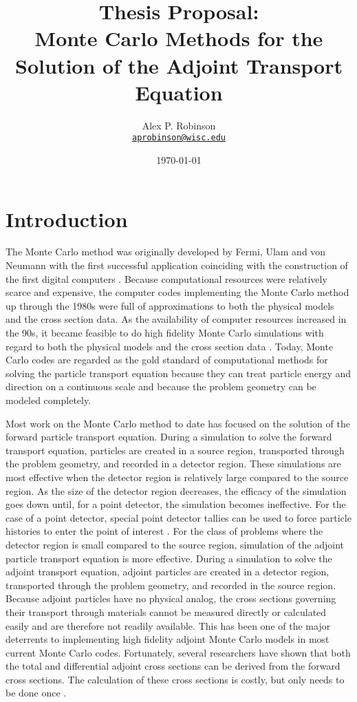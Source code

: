 \documentclass[letterpaper,12pt]{article}
\author{Alex P. Robinson
\\ \href{mailto:aprobinson@wisc.edu}{\texttt{aprobinson@wisc.edu}}
}
\date{\today}
\title{Thesis Proposal:\\
  Monte Carlo Methods for the Solution of the Adjoint Transport Equation}
\begin{document}
\maketitle

\section{Introduction}
The Monte Carlo method was originally developed by Fermi, Ulam and von Neumann with the first successful application coinciding with the construction of the first digital computers \cite{lux_monte_1991}. Because computational resources were relatively scarce and expensive, the computer codes implementing the Monte Carlo method up through the 1980s were full of approximations to both the physical models and the cross section data. As the availability of computer resources increased in the 90s, it became feasible to do high fidelity Monte Carlo simulations with regard to both the physical models and the cross section data \cite{chucas_preparing_1994}. Today, Monte Carlo codes are regarded as the gold standard of computational methods for solving the particle transport equation because they can treat particle energy and direction on a continuous scale and because the problem geometry can be modeled completely. 

Most work on the Monte Carlo method to date has focused on the solution of the forward particle transport equation. During a simulation to solve the forward transport equation, particles are created in a source region, transported through the problem geometry, and recorded in a detector region. These simulations are most effective when the detector region is relatively large compared to the source region. As the size of the detector region decreases, the efficacy of the simulation goes down until, for a point detector, the simulation becomes ineffective. For the case of a point detector, special point detector tallies can be used to force particle histories to enter the point of interest \cite{li_research_2008}. For the class of problems where the detector region is small compared to the source region, simulation of the adjoint particle transport equation is more effective. During a simulation to solve the adjoint transport equation, adjoint particles are created in a detector region, transported through the problem geometry, and recorded in the source region. Because adjoint particles have no physical analog, the cross sections governing their transport through materials cannot be measured directly or calculated easily and are therefore not readily available. This has been one of the major deterrents to implementing high fidelity adjoint Monte Carlo models in most current Monte Carlo codes. Fortunately, several researchers have shown that both the total and differential adjoint cross sections can be derived from the forward cross sections. The calculation of these cross sections is costly, but only needs to be done once \cite{hoogenboom_adjoint_1977}. 
\end{document}
